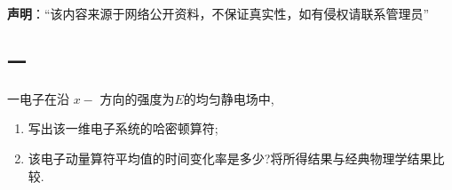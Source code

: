 
\textbf{声明}：“该内容来源于网络公开资料，不保证真实性，如有侵权请联系管理员”

\subsection{一}
一电子在沿 $x-$ 方向的强度为$E$的均匀静电场中,
\begin{enumerate}
\item 写出该一维电子系统的哈密顿算符;
\item 该电子动量算符平均值的时间变化率是多少?将所得结果与经典物理学结果比较.
\end{enumerate}
